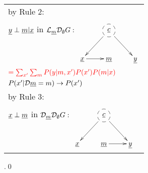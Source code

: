 \begin{longtable}{l}
\quad by Rule 2: 
\begin{tabular}{l}
\\
\end{tabular}
\\
\quad
${\underline{y}}\perp{\underline{m}}|{\underline{x}}$ in 
${\cal L}_{\underline{m}} {\cal D}_\emptyset G:$
$\xymatrix{
&*++[F-o]{\rvc}\ar[rd]\ar[ld]
\\
\rvx\ar[r]
&\rvm
&\rvy
}$
\\
$\color{red}=
\sum_{x'}
\sum_m
P(y|m, x')
P(x')
P(m|x)$
\\
\quad $P(x'|{\cal D}{\underline{m}}=m)
\rightarrow
P(x')$
\\
\quad by Rule 3: 
\begin{tabular}{l}
\\
\end{tabular}
\\
\quad
${\underline{x}}\perp{\underline{m}}$ in
${\cal D}_{\underline{m}} {\cal D}_\emptyset G:$
$\xymatrix{
&*++[F-o]{\rvc}\ar[rd]\ar[ld]
\\
\rvx
&\rvm\ar[r]
&\rvy
}$
\end{longtable}
.\qed


